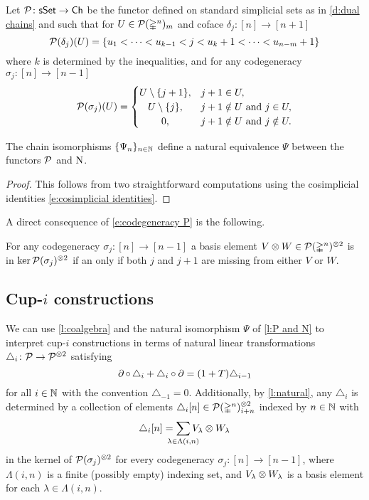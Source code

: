 \begin{definition}
	Let $\mathcal{P} \colon \mathsf{sSet} \to \mathsf{Ch}$ be the functor defined on standard simplicial sets as in \cref{d:dual chains} and such that for $U \in \mathcal{P}(\mathbb{\Delta}^n)_m$ and coface $\delta_j \colon [n] \to [n+1]$
	\[
	\mathcal{P}(\delta_j)(U) = \{ u_1 < \dots < u_{k-1} < j < u_k+1 < \dots < u_{n-m}+1 \}
	\]
	where $k$ is determined by the inequalities, and for any codegeneracy $\sigma_j \colon [n] \to [n-1]$
	\begin{equation} \label{e:codegeneracy P}
	\cP(\sigma_j)(U) = \begin{cases}
	U \setminus \{j+1\}, & j+1 \in U, \\
	\hfil U \setminus \{j\}, & j+1 \notin U \text{ and } j \in U, \\
	\hfil 0, & j+1 \notin U \text{ and } j \notin U.
	\end{cases}
	\end{equation}
\end{definition}

\begin{lemma} \label{l:P and N}
	The chain isomorphisms $\{\Psi_n\}_{n \in \mathbb{N}}$ define a natural equivalence $\Psi$ between the functors $\mathcal{P}$ and $\operatorname{N}$.
\end{lemma}

\begin{proof}
	This follows from two straightforward computations using the cosimplicial identities \eqref{e:cosimplicial identities}.
\end{proof}

A direct consequence of \cref{e:codegeneracy P} is the following.

\begin{lemma} \label{l:kernel of sxs}
	For any codegeneracy $\sigma_j \colon [n] \to [n-1]$ a basis element $V \otimes W \in \mathcal{P}(\mathbb{\Delta}^n)^{\otimes 2}$ is in $\ker \mathcal{P}(\sigma_j)^{\otimes 2}$ if an only if both $j$ and $j+1$ are missing from either $V$ or $W$.
\end{lemma}

\subsection{Cup-$i$ constructions}

We can use \cref{l:coalgebra} and the natural isomorphism $\Psi$ of \cref{l:P and N} to interpret \mbox{cup-$i$} constructions in terms of natural linear transformations $\triangle_i \colon \mathcal{P} \to \mathcal{P}^{\otimes 2}$ satisfying
\[
\operatorname{\partial} \circ \, \triangle_i + \triangle_i \circ \operatorname{\partial} =
(1+T) \triangle_{i-1}
\]
for all $i \in \mathbb{N}$ with the convention $\triangle_{-1} = 0$.
Additionally, by \cref{l:natural}, any $\triangle_i$ is determined by a collection of elements $\triangle_i [n] \in \mathcal{P}(\mathbb{\Delta}^n)^{\otimes 2}_{i+n} $ indexed by $n \in \mathbb{N}$ with
\[
\triangle_i [n] =
\sum_{\mathclap{\lambda \in \Lambda(i,n)}} V_\lambda \ot W_\lambda
\]
in the kernel of $\mathcal{P}(\sigma_j)^{\otimes 2}$ for every codegeneracy $\sigma_j \colon [n] \to [n-1]$,
where $\Lambda(i,n)$ is a finite (possibly empty) indexing set, and $V_\lambda \otimes W_\lambda$ is a basis element for each $\lambda \in \Lambda(i,n)$.

